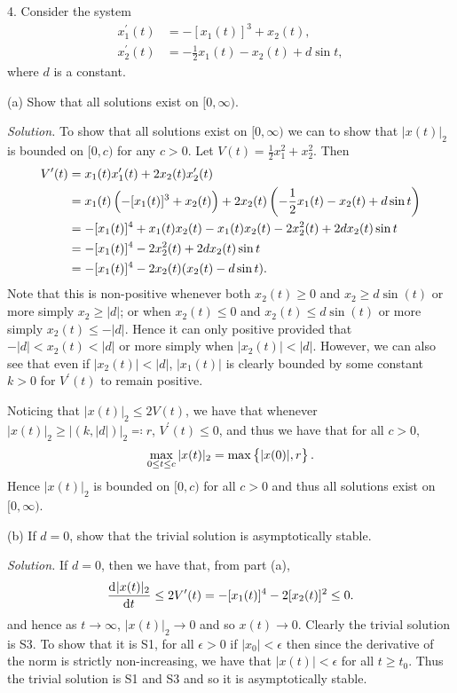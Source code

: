 \documentclass{article}
\begin{document}
\newpage

4. Consider the system
%
\begin{align*}
    x_1^\prime(t) &= - [x_1(t)]^3 + x_2(t), \\
    x_2^\prime(t) &= -\frac{1}{2} x_1(t) - x_2(t) + d \sin t,
\end{align*}
%
where $d$ is a constant.

(a) Show that all solutions exist on $[0, \infty)$.

\textit{Solution.}
To show that all solutions exist on $[0, \infty)$ we can to show that $|x(t)|_2$ is bounded
on $[0, c)$ for any $c > 0$. Let $V(t) = \frac{1}{2} x_1^2 + x_2^2$.
Then
%
\begin{align*}
    V^\prime(t)
        &= x_1(t) x_1^\prime(t) + 2 x_2(t) x_2^\prime(t) \\
        &= x_1(t) \del{- [x_1(t)]^3 + x_2(t)} + 2 x_2(t) \del{-\frac{1}{2} x_1(t) - x_2(t) + d \sin t} \\
        &= - [x_1(t)]^4 + x_1(t) x_2(t) - x_1(t)x_2(t) - 2 x_2^2(t) + 2 d x_2(t) \sin t \\
        &= - [x_1(t)]^4 - 2 x_2^2(t) + 2 d x_2(t) \sin t \\
        &= - [x_1(t)]^4 - 2 x_2(t) (x_2(t) - d \sin t)
        .
\end{align*}
%
Note that this is non-positive whenever both $x_2(t) \geq 0$ and $x_2 \geq d \sin(t)$ or more simply $x_2 \geq |d|$;
or when $x_2(t) \leq 0$ and $x_2(t) \leq d \sin(t)$ or more simply $x_2(t) \leq - |d|$. Hence it can only positive
provided that $-|d| < x_2(t) < |d|$ or more simply when $|x_2(t)| < |d|$. However, we can also see that even if $|x_2(t)| < |d|$,
$|x_1(t)|$ is clearly bounded by some constant $k > 0$ for $V^\prime(t)$ to remain positive.

Noticing that $|x(t)|_2 \leq 2 V(t)$, we have that whenever $|x(t)|_2 \geq |(k, |d|)|_2 \eqqcolon r$, $V^\prime(t) \leq 0$,
and thus we have that for all $c > 0$,
%
\begin{equation*}
    \max_{0 \leq t \leq c} |x(t)|_2 = \max \cbr{|x(0)|, r}
    .
\end{equation*}
%
Hence $|x(t)|_2$ is bounded on $[0, c)$ for all $c > 0$ and thus all solutions exist on $[0, \infty)$.

\vspace{5mm}

(b) If $d = 0$, show that the trivial solution is asymptotically stable.

\textit{Solution.}
If $d = 0$, then we have that, from part (a),
%
\begin{equation*}
    \dod{|x(t)|_2}{t} \leq 2 V^\prime(t) = - [x_1(t)]^4 - 2 [x_2(t)]^2 \leq 0
        .
\end{equation*}
%
and hence as $t \to \infty$, $|x(t)|_2 \to 0$ and so $x(t) \to 0$. Clearly the trivial solution is S3.
To show that it is S1, for all $\epsilon > 0$ if $|x_0| < \epsilon$ then since the derivative of the norm
is strictly non-increasing, we have that $|x(t)| < \epsilon$ for all $t \geq t_0$. Thus the trivial solution is
S1 and S3 and so it is asymptotically stable.
\end{document}
